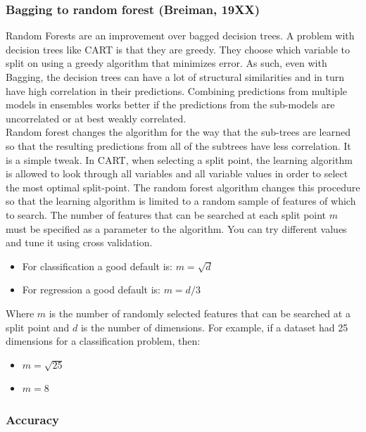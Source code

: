 \documentclass[final, paper=letter,5p,times,twocolumn]{elsarticle}
\begin{document}
\subsubsection{Bagging to random forest (Breiman, 19XX)}

Random Forests are an improvement over bagged decision trees. A problem with decision trees like CART is that they are greedy. They choose which variable to split on using a greedy algorithm that minimizes error. As such, even with Bagging, the decision trees can have a lot of structural similarities and in turn have high correlation in their predictions. Combining predictions from multiple models in ensembles works better if the predictions from the sub-models are uncorrelated or at best weakly correlated.  \\
Random forest changes the algorithm for the way that the sub-trees are learned so that the resulting predictions from all of the subtrees have less correlation. It is a simple tweak. In CART, when selecting a split point, the learning algorithm is allowed to look through all variables and all variable values in order to select the most optimal split-point. The random forest algorithm changes this procedure so that the learning algorithm is limited to a random sample of features of which to search. The number of features that can be searched at each split point $m$ must be specified as a parameter to the algorithm. You can try different values and tune it using cross validation.

\begin{itemize}
\item For classification a good default is: $m = \sqrt{d}$
\item For regression a good default is: $m = d/3$
\end{itemize}

Where $m$ is the number of randomly selected features that can be searched at a split point and $d$ is the number of dimensions. For example, if a dataset had 25 dimensions for a classification problem, then:

\begin{itemize}
\item $m = \sqrt{25}$
\item $m = 8$
\end{itemize}

\subsubsection{Accuracy}
\end{document}
